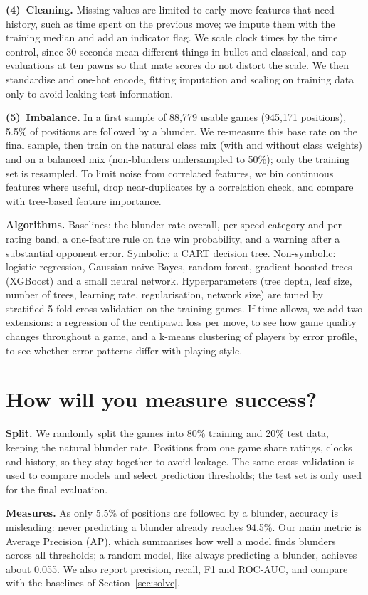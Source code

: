 \documentclass[a4paper,oneside,bibliography=totoc]{scrbook}
\begin{document}
\textbf{(4)~Cleaning.} Missing values are limited to early-move features that
need history, such as time spent on the previous move; we impute them with
the training median and add an indicator flag. We scale clock times by the
time control, since 30 seconds mean different things in bullet and classical,
and cap evaluations at ten pawns so that mate scores do not distort the
scale. We then standardise and one-hot encode, fitting imputation and scaling
on training data only to avoid leaking test information.

\textbf{(5)~Imbalance.} In a first sample of 88,779 usable games (945,171
positions), 5.5\% of positions are followed by a blunder. We re-measure this
base rate on the final sample, then train on the natural class mix (with and
without class weights) and on a balanced mix (non-blunders undersampled to
50\%); only the training set is resampled. To limit noise from correlated
features, we bin continuous features where useful, drop near-duplicates by a
correlation check, and compare with tree-based feature importance.

\textbf{Algorithms.} Baselines: the blunder rate overall, per speed category
and per rating band, a one-feature rule on the win probability, and a warning
after a substantial opponent error. Symbolic: a CART decision tree.
Non-symbolic: logistic regression, Gaussian naive Bayes, random forest,
gradient-boosted trees (XGBoost) and a small neural network. Hyperparameters
(tree depth, leaf size, number of trees, learning rate, regularisation,
network size) are tuned by stratified 5-fold cross-validation on the training
games. If time allows, we add two extensions: a regression of the centipawn
loss per move, to see how game quality changes throughout a game, and a
k-means clustering of players by error profile, to see whether error
patterns differ with playing style.

\section{How will you measure success?}

\textbf{Split.} We randomly split the games into 80\% training and 20\% test
data, keeping the natural blunder rate. Positions from one game share
ratings, clocks and history, so they stay together to avoid leakage. The
same cross-validation is used to compare models and select prediction
thresholds; the test set is only used for the final evaluation.

\textbf{Measures.} As only 5.5\% of positions are followed by a blunder,
accuracy is misleading: never predicting a blunder already reaches 94.5\%.
Our main metric is Average Precision (AP), which summarises how well a model
finds blunders across all thresholds; a random model, like always predicting
a blunder, achieves about 0.055. We also report precision, recall, F1 and
ROC-AUC, and compare with the baselines of Section~\ref{sec:solve}.
\end{document}
